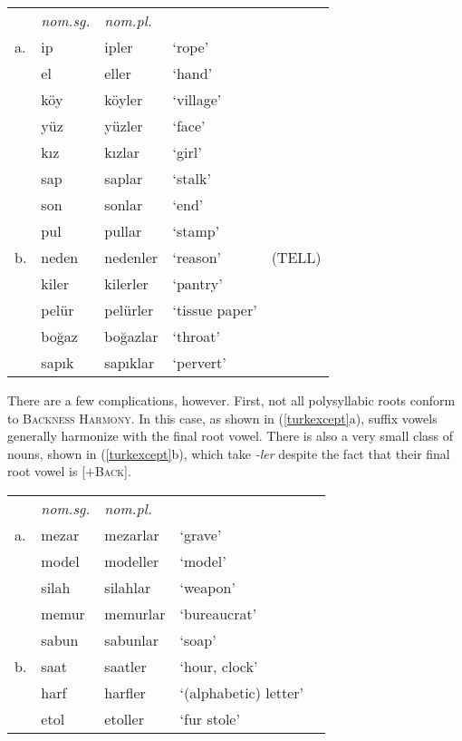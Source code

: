 \begin{example} \label{turknom}
\begin{tabular}{l l l l@{ }l}
   & \emph{nom.sg.} & \emph{nom.pl.} \\
a. & {ip}           & {ipler}    & `rope'        & \citep[][216]{Clements1982} \\
   & {el}           & {eller}    & `hand'    \\
   & {köy}          & {köyler}   & `village' \\
   & {yüz}          & {yüzler}   & `face'    \\
   & {kız}          & {kızlar}   & `girl'    \\
   & {sap}          & {saplar}   & `stalk'   \\
   & {son}          & {sonlar}   & `end'     \\
   & {pul}          & {pullar}   & `stamp'   \\
b. & {neden}        & {nedenler} & `reason'       & (TELL) \\ %
   & {kiler}        & {kilerler} & `pantry'       \\ %
   & {pelür}        & {pelürler} & `tissue paper' \\ %
   & {boğaz}        & {boğazlar} & `throat'       \\ %
   & {sapık}        & {sapıklar} & `pervert'      \\ %
\end{tabular}
\end{example}

There are a few complications, however. First, not all polysyllabic roots conform to \textsc{Backness Harmony}. In this case, as shown in (\ref{turkexcept}a), suffix vowels generally harmonize with the final root vowel. There is also a very small class of nouns, shown in (\ref{turkexcept}b), which take \emph{-ler} despite the fact that their final root vowel is [$+$\textsc{Back}].

\begin{example} \label{turkexcept}
\begin{tabular}{l l l l@{ }l}
   & \emph{nom.sg.} & \emph{nom.pl.} \\
a. & {mezar}        & {mezarlar} & `grave' & \citep{TELL} \\
   & {model}        & {modeller} & `model' \\
   & {silah}        & {silahlar} & `weapon'     \\
   & {memur}        & {memurlar} & `bureaucrat' \\
   & {sabun}        & {sabunlar} & `soap'       \\
b. & {saat}         & {saatler}  & `hour, clock' \\
   & {harf}         & {harfler}  & `(alphabetic) letter' \\ %
   & {etol}         & {etoller}  & `fur stole' \\
\end{tabular}
\end{example}

